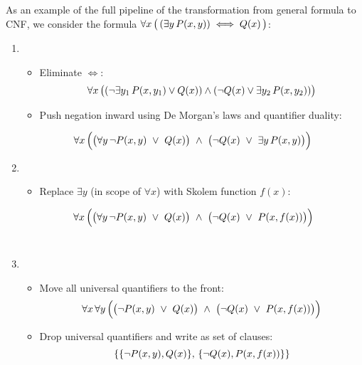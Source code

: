 As an example of the full pipeline of the transformation from general formula to CNF, we consider the formula \( \forall x  \, \big( \, (\exists y  \,   P(x,y)) \iff Q(x)  \,  \big)\):

\begin{enumerate}
    \item {}
    \begin{itemize}
        \item Eliminate \(\iff\):
          \[\forall x  \, \big( (\neg \exists y_1 \,  P(x,y_1) \lor Q(x)) \land (\neg Q(x) \lor \exists y_2 \,  P(x,y_2))\big)\]
        \item Push negation inward using De Morgan's laws and quantifier duality:
    \end{itemize}
    \[
    \forall x \, \Big(\big(\forall y \, \neg P(x,y)\ \lor\ Q(x)\big)\ \land\ \big(\neg Q(x)\ \lor\ \exists y \,  P(x,y)\big)\Big)
    \]
    
    
    \item {}
    \begin{itemize}
        \item Replace \(\exists y\) (in scope of \(\forall x\)) with Skolem function \(f(x)\):
    \end{itemize}
    \[
      \forall x \ms \Big(\big(\forall y \ms \neg P(x,y)\ \lor\ Q(x)\big)\ \land\ \big(\neg Q(x)\ \lor\ P(x,f(x))\big)\Big)
    \]
    \\
    \item {}
    \begin{itemize}
    \item Move all universal quantifiers to the front:
    \[
      \forall x \ms  \forall y \ms  \Big(\big(\neg P(x,y)\ \lor\ Q(x)\big)\ \land\ \big(\neg Q(x)\ \lor\ P(x,f(x))\big)\Big)
    \]
    \item Drop universal quantifiers and write as set of clauses:
    \[
      \{\{\neg P(x,y), Q(x)\}, \,  \{\neg Q(x), P(x,f(x))\}\}
    \]
    \end{itemize}
    
\end{enumerate}

